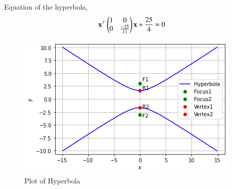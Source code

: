 \documentclass[journal,12pt,twocolumn]{IEEEtran}
\begin{document}
Equation of the hyperbola,
\begin{align}
    \mathbf{x}^{\top}\begin{pmatrix}1&0\\0&\frac{-25}{11}\end{pmatrix}\mathbf{x}+\frac{25}{4}=0
\end{align}
\begin{figure}[h]
\centering
\includegraphics[width=\columnwidth]{hyperbola_plot.png}
\caption{Plot of Hyperbola}
\label{fig:hyperbola}
\end{figure}
\end{document}
